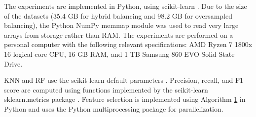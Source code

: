 \documentclass[./AutomatedMK.tex]{subfiles}
\begin{document}
The experiments are implemented in Python, using scikit-learn \citep{scikit-learn}. Due to the size of the  datasets (35.4 GB for hybrid balancing and 98.2 GB for oversampled balancing), the Python NumPy memmap \citep{numpy, memmap} module was used to read very large arrays from storage rather than RAM. The experiments are performed on a personal computer with the following relevant specifications: AMD Ryzen 7 1800x 16 logical core CPU, 16 GB RAM, and 1 TB Samsung 860 EVO Solid State Drive. 

KNN and RF use the scikit-learn default parameters \citep{scikit-learn}. Precision, recall, and F1 score are computed using functions implemented by the scikit-learn sklearn.metrics package \citep{scikit-learn}. Feature selection is implemented using Algorithm \hyperlink{alg:FS}{1} in Python and uses the Python multiprocessing package \citep{multiprocessing} for parallelization.
\end{document}
